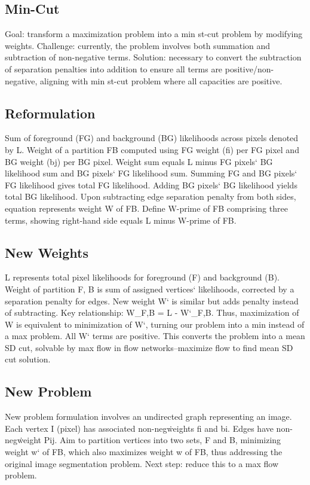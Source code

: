 \subsection*{Min-Cut}
Goal: transform a maximization problem into a min st-cut problem by modifying weights.
Challenge: currently, the problem involves both summation and subtraction of non-negative terms.
Solution: necessary to convert the subtraction of separation penalties into addition to ensure all terms are positive/non-negative, aligning with min st-cut problem where all capacities are positive.

\subsection*{Reformulation}
Sum of foreground (FG) and background (BG) likelihoods across pixels denoted by L\@.
Weight of a partition FB computed using FG weight (fi) per FG pixel and BG weight (bj) per BG pixel.
Weight sum equals L minus FG pixels` BG likelihood sum and BG pixels` FG likelihood sum.
Summing FG and BG pixels` FG likelihood gives total FG likelihood.
Adding BG pixels` BG likelihood yields total BG likelihood.
Upon subtracting edge separation penalty from both sides, equation represents weight W of FB\@.
Define W-prime of FB comprising three terms, showing right-hand side equals L minus W-prime of FB\@.

\subsection*{New Weights}
L represents total pixel likelihoods for foreground (F) and background (B).
Weight of partition F, B is sum of assigned vertices` likelihoods, corrected by a separation penalty for edges.
New weight W` is similar but adds penalty instead of subtracting.
Key relationship: W\_F,B = L - W`\_F,B\@.
Thus, maximization of W is equivalent to minimization of W`, turning our problem into a min instead of a max problem.
All W` terms are positive.
This converts the problem into a mean SD cut, solvable by max flow in flow networks--maximize flow to find mean SD cut solution.

\subsection*{New Problem}
New problem formulation involves an undirected graph representing an image.
Each vertex I (pixel) has associated non-neg\. weights fi and bi.
Edges have non-neg\. weight Pij.
Aim to partition vertices into two sets, F and B, minimizing weight w` of FB, which also maximizes weight w of FB, thus addressing the original image segmentation problem.
Next step: reduce this to a max flow problem.

